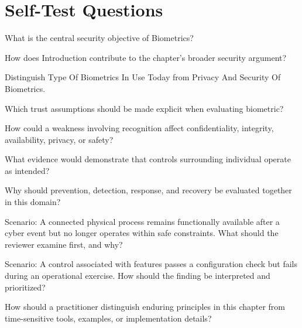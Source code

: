 \documentclass[11pt,letterpaper]{article}
\begin{document}
\section*{Self-Test Questions}
\begin{CornellRecallList}
\item What is the central security objective of Biometrics?
\item How does Introduction contribute to the chapter's broader security argument?
\item Distinguish Type Of Biometrics In Use Today from Privacy And Security Of Biometrics.
\item Which trust assumptions should be made explicit when evaluating biometric?
\item How could a weakness involving recognition affect confidentiality, integrity, availability, privacy, or safety?
\item What evidence would demonstrate that controls surrounding individual operate as intended?
\item Why should prevention, detection, response, and recovery be evaluated together in this domain?
\item Scenario: A connected physical process remains functionally available after a cyber event but no longer operates within safe constraints. What should the reviewer examine first, and why?
\item Scenario: A control associated with features passes a configuration check but fails during an operational exercise. How should the finding be interpreted and prioritized?
\item How should a practitioner distinguish enduring principles in this chapter from time-sensitive tools, examples, or implementation details?
\end{CornellRecallList}
\end{document}
